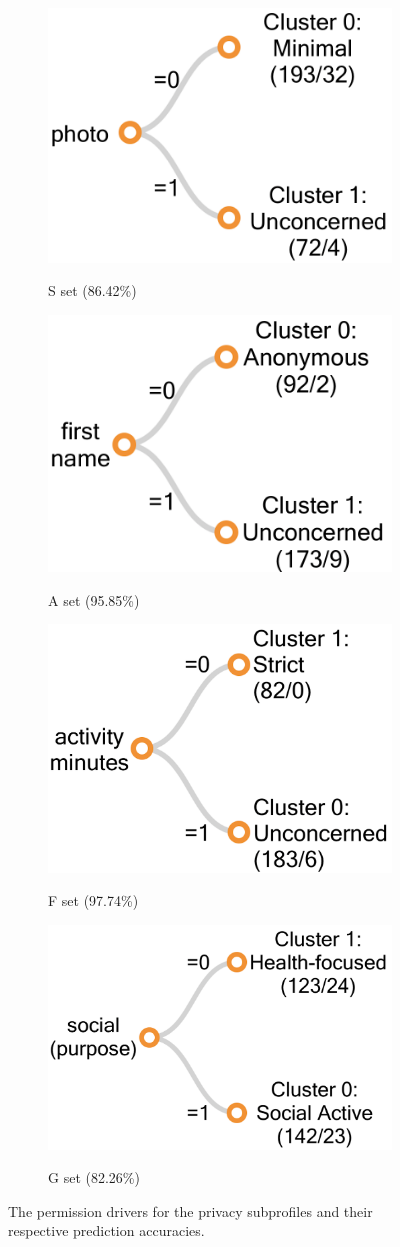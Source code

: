 \begin{figure}[t]
	\centering
	\begin{subfigure}[b]{0.4\linewidth}
		\includegraphics[width=0.5\linewidth]{figures/s_tree1new.png}
		\label{fig:stree1}
		\caption{S set (86.42\%)}
	\end{subfigure}
	\begin{subfigure}[b]{0.4\linewidth}
		\includegraphics[width=0.5\linewidth]{figures/a_tree1new.png}
		\label{fig:atree1}
		\caption{A set (95.85\%)}
	\end{subfigure}
	\begin{subfigure}[b]{0.4\linewidth}
		\includegraphics[width=0.5\linewidth]{figures/f_tree1new.png}
		\label{fig:ftree1}
		\caption{F set (97.74\%)}
	\end{subfigure}	
 	\begin{subfigure}[b]{0.4\linewidth}
	 	\includegraphics[width=0.5\linewidth]{figures/g_tree1new.png}
	 	\label{fig:gtree1}
	 \caption{G set (82.26\%)}
	\end{subfigure}

	\caption{The permission drivers for the privacy subprofiles and their respective prediction accuracies.}
	\label{fig:tree1}
\end{figure} 


